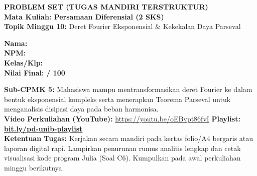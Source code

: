 \documentclass[10pt,a4paper]{article}
\begin{document}
\noindent\begin{minipage}[c]{0.68\textwidth}%
  {\large\textbf{\color{unibblue}PROBLEM SET (TUGAS MANDIRI TERSTRUKTUR)}}\\[1mm]
  {\normalsize\textbf{Mata Kuliah: Persamaan Diferensial (2 SKS)}}\\[0.5mm]
  {\small\textbf{Topik Minggu 10:} Deret Fourier Eksponensial \& Kekekalan Daya Parseval}%
\end{minipage}%
\hfill%
\begin{minipage}[c]{0.30\textwidth}%
  \begin{tcolorbox}[colback=unibblue!5,colframe=unibblue,boxrule=0.6pt,arc=2pt,left=4pt,right=4pt,top=2pt,bottom=2pt]
    \scriptsize
    \textbf{Nama:} \dotfill\\[1.2mm]
    \textbf{NPM:} \dotfill\\[1.2mm]
    \textbf{Kelas/Klp:} \dotfill\\[1.2mm]
    \textbf{Nilai Final:} \hfill \textbf{/ 100}
  \end{tcolorbox}%
\end{minipage}\par

\vspace{1.5mm}

\begin{tcolorbox}[colback=boxbg,colframe=unibgold!90!black,boxrule=0.6pt,arc=2pt,left=5pt,right=5pt,top=3pt,bottom=3pt,title=\textbf{\scriptsize Capaian Pembelajaran (Sub-CPMK 5) \& Pedoman Pengerjaan Tugas}]
  \scriptsize
  \textbf{Sub-CPMK 5:} Mahasiswa mampu mentransformasikan deret Fourier ke dalam bentuk eksponensial kompleks serta menerapkan Teorema Parseval untuk menganalisis disipasi daya pada beban harmonisa.\\
  \textbf{Video Perkuliahan (YouTube):} \url{https://youtu.be/oEBvpt86fvI} \hfill \textbf{Playlist:} \href{https://www.youtube.com/playlist?list=PLS5oOZWXZeTw}{\color{unibblue}\textbf{bit.ly/pd-unib-playlist}}\\\textbf{Ketentuan Tugas:} Kerjakan secara mandiri pada kertas folio/A4 bergaris atau laporan digital rapi. Lampirkan penurunan rumus analitis lengkap dan cetak visualisasi kode program Julia (Soal C6). Kumpulkan pada awal perkuliahan minggu berikutnya.
\end{tcolorbox}

\vspace{1.5mm}
\end{document}
